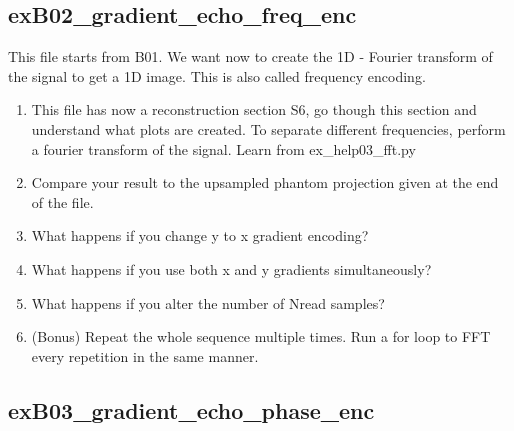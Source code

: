\documentclass[a4paper,12pt]{extarticle}
\begin{document}
\subsection{exB02\_gradient\_echo\_freq\_enc}
This file starts from B01. We want now to create the 1D - Fourier transform of the signal to get a 1D image. This is also called frequency encoding.
\begin{enumerate}
\item This file has now a reconstruction section S6, go though this section and understand what plots are created. To separate different frequencies, perform a fourier transform of the signal. Learn from ex\_help03\_fft.py
\item Compare your result to the upsampled phantom projection given at the end of the file.
\item What happens if you change y to x gradient encoding?
\item What happens if you use both x and y gradients simultaneously?
\item What happens if you alter the number of Nread samples? 

\item (Bonus) Repeat the whole sequence multiple times. Run a for loop to FFT every repetition in the same manner.

\end{enumerate}

\subsection{exB03\_gradient\_echo\_phase\_enc}
\end{document}
